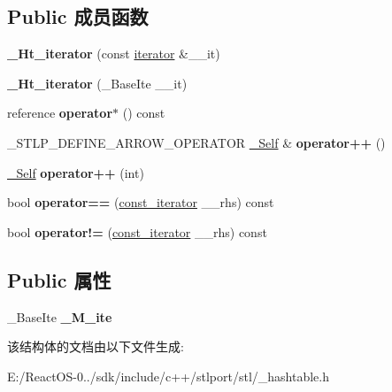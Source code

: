 \subsection*{Public 成员函数}
\begin{DoxyCompactItemize}
\item 
\mbox{\label{struct___ht__iterator_aeacd490157afac50ef1da3911bb14374}} 
{\bfseries \+\_\+\+Ht\+\_\+iterator} (const \hyperlink{struct___ht__iterator}{iterator} \&\+\_\+\+\_\+it)
\item 
\mbox{\label{struct___ht__iterator_aedce1eb4f4d6aa8fd6ec63b0ff57f5b2}} 
{\bfseries \+\_\+\+Ht\+\_\+iterator} (\+\_\+\+Base\+Ite \+\_\+\+\_\+it)
\item 
\mbox{\label{struct___ht__iterator_aa9d583b3c260595a14d2449095adb2fe}} 
reference {\bfseries operator$\ast$} () const
\item 
\mbox{\label{struct___ht__iterator_a5c6aae1c2260fe232b0511e1bcae4614}} 
\+\_\+\+S\+T\+L\+P\+\_\+\+D\+E\+F\+I\+N\+E\+\_\+\+A\+R\+R\+O\+W\+\_\+\+O\+P\+E\+R\+A\+T\+OR \hyperlink{struct___ht__iterator}{\+\_\+\+Self} \& {\bfseries operator++} ()
\item 
\mbox{\label{struct___ht__iterator_a00f0f4ba5f6fd575e239adba397c06c7}} 
\hyperlink{struct___ht__iterator}{\+\_\+\+Self} {\bfseries operator++} (int)
\item 
\mbox{\label{struct___ht__iterator_ae4dfaf493d048789df320901ec491fac}} 
bool {\bfseries operator==} (\hyperlink{struct___ht__iterator}{const\+\_\+iterator} \+\_\+\+\_\+rhs) const
\item 
\mbox{\label{struct___ht__iterator_a43e98c040c1137413bd99aa2fa710d1f}} 
bool {\bfseries operator!=} (\hyperlink{struct___ht__iterator}{const\+\_\+iterator} \+\_\+\+\_\+rhs) const
\end{DoxyCompactItemize}
\subsection*{Public 属性}
\begin{DoxyCompactItemize}
\item 
\mbox{\label{struct___ht__iterator_a9cec3c1c0ba865861050140d87b4ec42}} 
\+\_\+\+Base\+Ite {\bfseries \+\_\+\+M\+\_\+ite}
\end{DoxyCompactItemize}


该结构体的文档由以下文件生成\+:\begin{DoxyCompactItemize}
\item 
E\+:/\+React\+O\+S-\/0../sdk/include/c++/stlport/stl/\+\_\+hashtable.\+h\end{DoxyCompactItemize}
